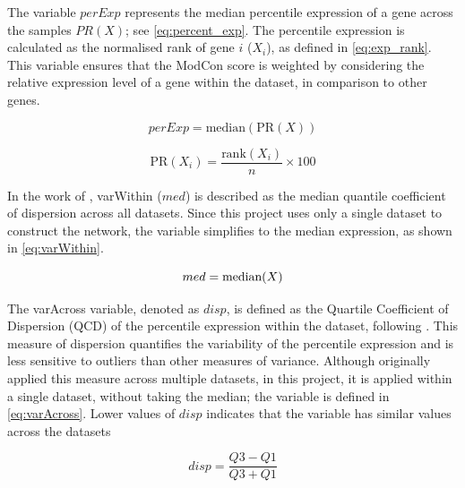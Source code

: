 The variable $perExp$ represents the median percentile expression of a gene across the samples $PR(X)$; see \cref{eq:percent_exp}. The percentile expression is calculated as the normalised rank of gene $i$ (\(X_i\)), as defined in \cref{eq:exp_rank}. This variable ensures that the ModCon score is weighted by considering the relative expression level of a gene within the dataset, in comparison to other genes.

\begin{equation} \label{eq:percent_exp}
    perExp = \text{median}\left(\text{PR}(X)\right)
\end{equation}

\begin{equation} \label{eq:exp_rank}
    \text{PR}(X_i) = \frac{\text{rank}(X_i)}{n} \times 100
\end{equation}

In the work of \citet{Care2019-ij}, varWithin ($med$) is described as the median quantile coefficient of dispersion across all datasets. Since this project uses only a single dataset to construct the network, the variable simplifies to the median expression, as shown in \cref{eq:varWithin}.


\begin{equation} \label{eq:varWithin}
    med = \text{median}(X) \\
\end{equation}

The varAcross variable, denoted as $disp$, is defined as the Quartile Coefficient of Dispersion (QCD) of the percentile expression within the dataset, following \citet{Care2019-ij}. This measure of dispersion quantifies the variability of the percentile expression and is less sensitive to outliers than other measures of variance. Although \citet{Care2019-ij} originally applied this measure across multiple datasets, in this project, it is applied within a single dataset, without taking the median; the variable is defined in \cref{eq:varAcross}. Lower values of $disp$ indicates that the variable has similar values across the datasets


\begin{equation} \label{eq:varAcross}
    disp = \frac{Q3 - Q1}{Q3 + Q1}
\end{equation}


